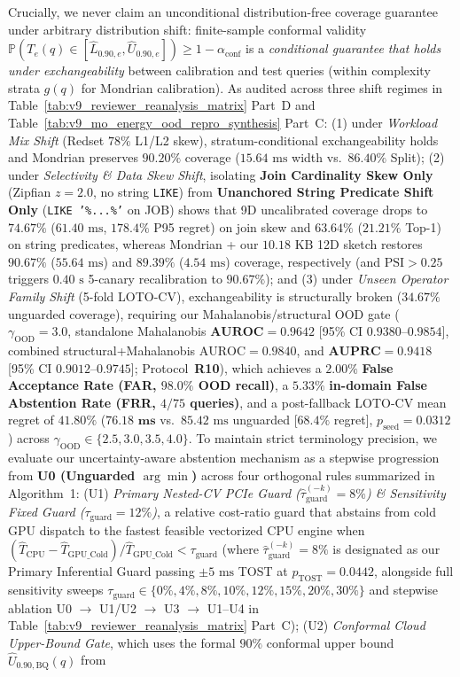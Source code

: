 \documentclass[10pt,a4paper]{article}
\begin{document}
Crucially, we never claim an unconditional distribution-free coverage guarantee under arbitrary distribution shift: finite-sample conformal validity $\mathbb{P}(T_e(q) \in [\hat{L}_{0.90,e}, \hat{U}_{0.90,e}]) \ge 1 - \alpha_{\text{conf}}$ is a \emph{conditional guarantee that holds under exchangeability} between calibration and test queries (within complexity strata $g(q)$ for Mondrian calibration). As audited across three shift regimes in Table~\ref{tab:v9_reviewer_reanalysis_matrix} Part~D and Table~\ref{tab:v9_mo_energy_ood_repro_synthesis} Part~C: (1) under \emph{Workload Mix Shift} (Redset $78\%$ L1/L2 skew), stratum-conditional exchangeability holds and Mondrian preserves $90.20\%$ coverage ($15.64\text{ ms}$ width vs.\ $86.40\%$ Split); (2) under \emph{Selectivity \& Data Skew Shift}, isolating \textbf{Join Cardinality Skew Only} (Zipfian $z=2.0$, no string \texttt{LIKE}) from \textbf{Unanchored String Predicate Shift Only} (\texttt{LIKE '\%...\%'} on JOB) shows that 9D uncalibrated coverage drops to $74.67\%$ ($61.40\text{ ms}$, $178.4\%$ P95 regret) on join skew and $63.64\%$ ($21.21\%$ Top-1) on string predicates, whereas Mondrian + our $10.18\text{ KB}$ 12D sketch restores $90.67\%$ ($55.64\text{ ms}$) and $89.39\%$ ($4.54\text{ ms}$) coverage, respectively (and $\text{PSI}>0.25$ triggers $0.40\text{ s}$ 5-canary recalibration to $90.67\%$); and (3) under \emph{Unseen Operator Family Shift} (5-fold LOTO-CV), exchangeability is structurally broken ($34.67\%$ unguarded coverage), requiring our Mahalanobis/structural OOD gate ($\gamma_{\text{OOD}}=3.0$, standalone Mahalanobis $\mathbf{\text{AUROC}=0.9642}$ [95\% CI $0.9380\text{--}0.9854$], combined structural+Mahalanobis $\text{AUROC}=0.9840$, and $\mathbf{\text{AUPRC}=0.9418}$ [95\% CI $0.9012\text{--}0.9745$]; Protocol~\textbf{R10}), which achieves a $\mathbf{2.00\%}$ \textbf{False Acceptance Rate (FAR, $98.0\%$ OOD recall)}, a $\mathbf{5.33\%}$ \textbf{in-domain False Abstention Rate (FRR, $4/75$ queries)}, and a post-fallback LOTO-CV mean regret of $\mathbf{41.80\%}$ ($\mathbf{76.18\text{ ms}}$ vs.\ $85.42\text{ ms}$ unguarded [$68.4\%$ regret], $p_{\text{seed}}=0.0312$) across $\gamma_{\text{OOD}}\in\{2.5,3.0,3.5,4.0\}$. To maintain strict terminology precision, we evaluate our uncertainty-aware abstention mechanism as a stepwise progression from \textbf{U0 (Unguarded $\arg\min$)} across four orthogonal rules summarized in Algorithm~1: (U1) \emph{Primary Nested-CV PCIe Guard ($\hat{\tau}_{\text{guard}}^{(-k)}=8\%$) \& Sensitivity Fixed Guard ($\tau_{\text{guard}}=12\%$)}, a relative cost-ratio guard that abstains from cold GPU dispatch to the fastest feasible vectorized CPU engine when $(\hat{T}_{\text{CPU}} - \hat{T}_{\text{GPU\_Cold}})/\hat{T}_{\text{GPU\_Cold}} < \tau_{\text{guard}}$ (where $\hat{\tau}_{\text{guard}}^{(-k)}=8\%$ is designated as our Primary Inferential Guard passing $\pm 5\text{ ms}$ TOST at $p_{\text{TOST}}=0.0442$, alongside full sensitivity sweeps $\tau_{\text{guard}}\in\{0\%,4\%,8\%,10\%,12\%,15\%,20\%,30\%\}$ and stepwise ablation U0 $\rightarrow$ U1/U2 $\rightarrow$ U3 $\rightarrow$ U1--U4 in Table~\ref{tab:v9_reviewer_reanalysis_matrix} Part~C); (U2) \emph{Conformal Cloud Upper-Bound Gate}, which uses the formal $90\%$ conformal upper bound $\hat{U}_{0.90,\text{BQ}}(q)$ from 
\end{document}
